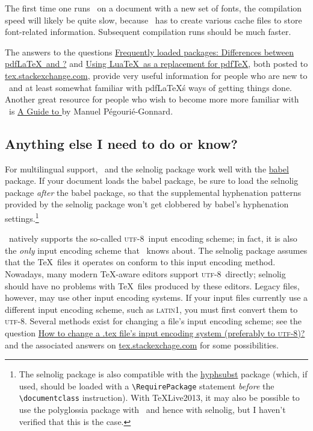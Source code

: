 \documentclass[11pt]{article}
\newcommand{\pkg}[1]{\textsf{#1}}
\newcommand\utf{\textsc{utf-8}}
\begin{document}
The first time one runs \LuaLaTeX\ on a document with a new set of fonts, the compilation speed will likely be quite slow, because \LuaLaTeX\ has to create various cache files to store font-related information. Subsequent compilation runs should be much faster. 

The answers to the questions \href{http://tex.stackexchange.com/q/28642/5001}{Frequently loaded packages: Differences between pdf\LaTeX\ and \LuaLaTeX?} and \href{http://tex.stackexchange.com/q/32295/5001}{Using Lua\TeX\ as a replacement for pdf\TeX}, both posted to \href{http://tex.stackexchange.com/}{tex.stackexchange.com}, provide very useful information for people who are new to \LuaLaTeX\ and at least somewhat familiar with pdf\LaTeX\'s ways of getting things done. Another great resource for people who wish to become more more familiar with \LuaLaTeX\ is \href{http://mirror.ctan.org/info/luatex/lualatex-doc/lualatex-doc.pdf}{A Guide to \LuaLaTeX} by Manuel Pégourié-Gonnard.


\subsection{Anything else I need to do or know?} \label{sec:anythingelse}

For multilingual support, \LuaLaTeX\ and the \pkg{selnolig} package work well with the \href{http://www.ctan.org/pkg/babel}{\pkg{babel}} package. If your document loads the \pkg{babel} package, be sure to load the \pkg{selnolig} package \emph{after} the \pkg{babel} package, so that the supplemental hyphenation patterns provided by the \pkg{selnolig} package won't get clobbered by \pkg{babel}'s hyphenation settings.\footnote{The \pkg{selnolig} package is also compatible with the \href{http://www.ctan.org/pkg/hyphsubst}{\pkg{hyphsubst}} package (which, if used, should be loaded with a \Verb+\RequirePackage+ statement \emph{before} the \Verb+\documentclass+ instruction). With \TeX Live2013, it may also be possible to use the \pkg{polyglossia} package with \LuaLaTeX\ and hence with \pkg{selnolig}, but I haven't verified that this is the case.}

\LuaLaTeX\ natively supports the so-called \utf\ input encoding scheme; in fact, it is also the \emph{only} input encoding scheme that \LuaLaTeX\ knows about. The \pkg{selnolig} package assumes that the \TeX\ files it operates on conform to this input encoding method. Nowadays, many modern \TeX-aware editors support \utf\ directly; \pkg{selnolig} should have no problems with \TeX\ files produced by these editors. Legacy files, however, may use other input encoding systems. If your input files currently use a different input encoding scheme, such as \textsc{latin1}, you must first convert them to \utf. Several methods exist for changing a file's input encoding scheme; see the question \href{http://tex.stackexchange.com/q/87406/5001}{How to change a .tex file's input encoding system (preferably to \utf)?} and the associated answers on \url{tex.stackexchage.com} for some possibilities.
\end{document}
